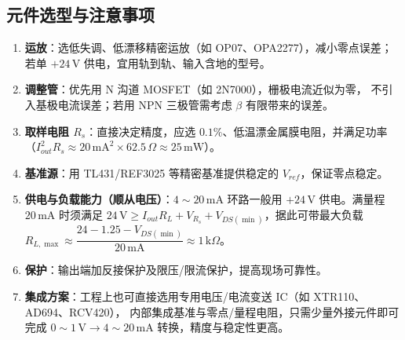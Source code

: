 \documentclass[12pt,a4paper]{ctexart}
\begin{document}
\subsection{元件选型与注意事项}
\begin{enumerate}
  \item \textbf{运放}：选低失调、低漂移精密运放（如 OP07、OPA2277），减小零点误差；若单 $+24\,\mathrm{V}$
        供电，宜用轨到轨、输入含地的型号。
  \item \textbf{调整管}：优先用 N 沟道 MOSFET（如 2N7000），栅极电流近似为零，
        不引入基极电流误差；若用 NPN 三极管需考虑 $\beta$ 有限带来的误差。
  \item \textbf{取样电阻 $R_s$}：直接决定精度，应选 $0.1\%$、低温漂金属膜电阻，并满足功率
        （$I_{out}^{2}R_s\approx 20\,\mathrm{mA}^2\times 62.5\,\Omega\approx 25\,\mathrm{mW}$）。
  \item \textbf{基准源}：用 TL431/REF3025 等精密基准提供稳定的 $V_{ref}$，保证零点稳定。
  \item \textbf{供电与负载能力（顺从电压）}：$4\!\sim\!20\,\mathrm{mA}$ 环路一般用 $+24\,\mathrm{V}$
        供电。满量程 $20\,\mathrm{mA}$ 时须满足
        $24\,\mathrm{V}\ge I_{out}R_L+V_{R_s}+V_{DS(\min)}$，据此可带最大负载
        $R_{L,\max}\approx\dfrac{24-1.25-V_{DS(\min)}}{20\,\mathrm{mA}}\approx 1\,\mathrm{k}\Omega$。
  \item \textbf{保护}：输出端加反接保护及限压/限流保护，提高现场可靠性。
  \item \textbf{集成方案}：工程上也可直接选用专用电压/电流变送 IC（如 XTR110、AD694、RCV420），
        内部集成基准与零点/量程电阻，只需少量外接元件即可完成 $0\!\sim\!1\,\mathrm{V}\to 4\!\sim\!20\,\mathrm{mA}$
        转换，精度与稳定性更高。
\end{enumerate}
\end{document}
